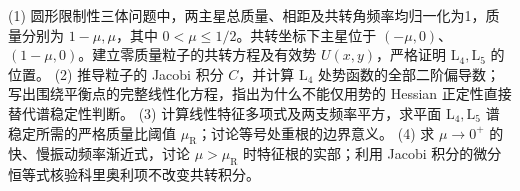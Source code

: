 (1) 圆形限制性三体问题中，两主星总质量、相距及共转角频率均归一化为1，质量分别为 \(1-\mu,\mu\)，其中 \(0<\mu\le 1/2\)。共转坐标下主星位于 \((-\mu,0)\)、\((1-\mu,0)\)。建立零质量粒子的共转方程及有效势 \(U(x,y)\)，严格证明 \(\mathrm L_4,\mathrm L_5\) 的位置。
(2) 推导粒子的 Jacobi 积分 \(C\)，并计算 \(\mathrm L_4\) 处势函数的全部二阶偏导数；写出围绕平衡点的完整线性化方程，指出为什么不能仅用势的 Hessian 正定性直接替代谱稳定性判断。
(3) 计算线性特征多项式及两支频率平方，求平面 \(\mathrm L_4,\mathrm L_5\) 谱稳定所需的严格质量比阈值 \(\mu_{\mathrm R}\)；讨论等号处重根的边界意义。
(4) 求 \(\mu\to0^+\) 的快、慢振动频率渐近式，讨论 \(\mu>\mu_{\mathrm R}\) 时特征根的实部；利用 Jacobi 积分的微分恒等式核验科里奥利项不改变共转积分。
